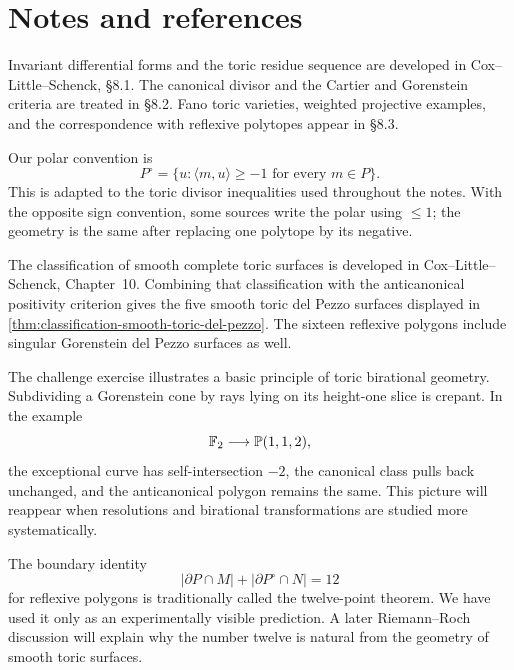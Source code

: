 \clearpage
\section*{Notes and references}

Invariant differential forms and the toric residue sequence are
developed in Cox--Little--Schenck, \S8.1. The canonical divisor and
the Cartier and Gorenstein criteria are treated in \S8.2. Fano toric
varieties, weighted projective examples, and the correspondence with
reflexive polytopes appear in \S8.3.

Our polar convention is
\[
P^\circ
=
\{u:\langle m,u\rangle\geq-1\text{ for every }m\in P\}.
\]
This is adapted to the toric divisor inequalities used throughout the
notes. With the opposite sign convention, some sources write the
polar using \(\leq1\); the geometry is the same after replacing one
polytope by its negative.

The classification of smooth complete toric surfaces is developed in
Cox--Little--Schenck, Chapter~10. Combining that classification with
the anticanonical positivity criterion gives the five smooth toric
del Pezzo surfaces displayed in \cref{thm:classification-smooth-toric-del-pezzo}.
The sixteen reflexive polygons include singular Gorenstein del Pezzo
surfaces as well.

The challenge exercise illustrates a basic principle of toric
birational geometry. Subdividing a Gorenstein cone by rays lying on
its height-one slice is crepant. In the example
\[
\mathbb F_2\longrightarrow\mathbb{P}(1,1,2),
\]
the exceptional curve has self-intersection \(-2\), the canonical
class pulls back unchanged, and the anticanonical polygon remains the
same. This picture will reappear when resolutions and birational
transformations are studied more systematically.

The boundary identity
\[
|\partial P\cap M|+|\partial P^\circ\cap N|=12
\]
for reflexive polygons is traditionally called the twelve-point
theorem. We have used it only as an experimentally visible prediction.
A later Riemann--Roch discussion will explain why the number twelve is
natural from the geometry of smooth toric surfaces.
